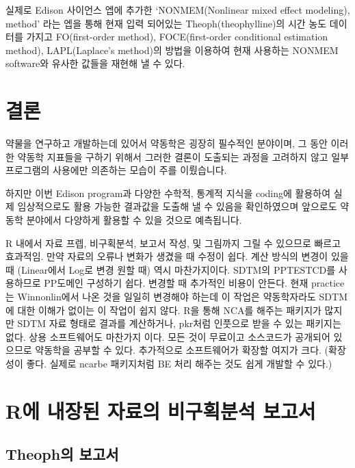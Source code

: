\documentclass[12pt,]{krantz}
\theoremstyle{definition}
\theoremstyle{definition}
\theoremstyle{definition}
\theoremstyle{remark}
\begin{document}
실제로 Edison 사이언스 엡에 추가한 `NONMEM(Nonlinear mixed effect
modeling), method' 라는 엡을 통해 현재 입력 되어있는
Theoph(theophylline)의 시간 농도 데이터를 가지고 FO(first-order method),
FOCE(first-order conditional estimation method), LAPL(Laplace's
method)의 방법을 이용하여 현재 사용하는 NONMEM software와 유사한 값들을
재현해 낼 수 있다.

\chapter{결론}\label{conclusion}

약물을 연구하고 개발하는데 있어서 약동학은 굉장히 필수적인 분야이며, 그
동안 이러한 약동학 지표들을 구하기 위해서 그러한 결론이 도출되는 과정을
고려하지 않고 일부 프로그램의 사용에만 의존하는 모습이 주를 이뤘습니다.

하지만 이번 Edison program과 다양한 수학적, 통계적 지식을 coding에
활용하여 실제 임상적으로도 활용 가능한 결과값을 도출해 낼 수 있음을
확인하였으며 앞으로도 약동학 분야에서 다양하게 활용할 수 있을 것으로
예측됩니다.

R 내에서 자료 프렙, 비구획분석, 보고서 작성, 및 그림까지 그릴 수
있으므로 빠르고 효과적임. 만약 자료의 오류나 변화가 생겼을 때 수정이
쉽다. 계산 방식의 변경이 있을때 (Linear에서 Log로 변경 원할 때) 역시
마찬가지이다. SDTM의 PPTESTCD를 사용하므로 PP도메인 구성하기 쉽다.
변경할 때 추가적인 비용이 안든다. 현재 practice는 Winnonlin에서 나온
것을 일일히 변경해야 하는데 이 작업은 약동학자라도 SDTM에 대한 이해가
없이는 이 작업이 쉽지 않다. R을 통해 NCA를 해주는 패키지가 많지만 SDTM
자료 형태로 결과를 계산하거나, pkr처럼 인풋으로 받을 수 있는 패키지는
없다. 상용 소프트웨어도 마찬가지 이다. 모든 것이 무료이고 소스코드가
공개되어 있으므로 약동학을 공부할 수 있다. 추가적으로 소프트웨어가
확장할 여지가 크다. (확장성이 좋다. 실제로 ncarbe 패키지처럼 BE 처리
해주는 것도 쉽게 개발할 수 있다.)

\cleardoublepage

\appendix {}


\chapter{R에 내장된 자료의 비구획분석 보고서}\label{groupreport}

\section{Theoph의 보고서}\label{theophgroup}
\end{document}
